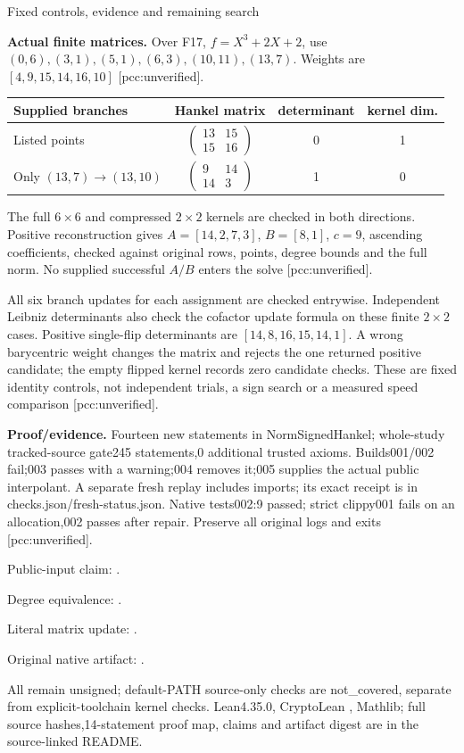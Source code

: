 \documentclass[11pt]{article}
\begin{document}
\newpage
{\Large Fixed controls, evidence and remaining search}\par
\textbf{Actual finite matrices.} Over F17, $f=X^3+2X+2$, use
$(0,6),(3,1),(5,1),(6,3),(10,11),(13,7)$. Weights are
$[4,9,15,14,16,10]$ [pcc:unverified].
\begin{center}
\begin{tabular}{lccc}
Supplied branches & Hankel matrix & determinant & kernel dim.\\\hline
Listed points & $\begin{pmatrix}13&15\\15&16\end{pmatrix}$ &0&1\\[6pt]
Only $(13,7)\to(13,10)$ & $\begin{pmatrix}9&14\\14&3\end{pmatrix}$ &1&0
\end{tabular}
\end{center}
The full $6\times6$ and compressed $2\times2$ kernels are checked in both
directions. Positive reconstruction gives $A=[14,2,7,3]$, $B=[8,1]$, $c=9$,
ascending coefficients, checked against original rows, points, degree bounds
and the full norm. No supplied successful $A/B$ enters the solve
[pcc:unverified].

All six branch updates for each assignment are checked entrywise. Independent
Leibniz determinants also check the cofactor update formula on these finite
$2\times2$ cases. Positive single-flip determinants are
$[14,8,16,15,14,1]$. A wrong barycentric weight changes the matrix and rejects
the one returned positive candidate; the empty flipped kernel records zero
candidate checks. These are fixed identity controls, not independent trials,
a sign search or a measured speed comparison [pcc:unverified].

\textbf{Proof/evidence.} Fourteen new statements in NormSignedHankel;
whole-study tracked-source gate245 statements,0 additional trusted axioms.
Builds001/002 fail;003 passes with a warning;004 removes it;005 supplies the
actual public interpolant. A separate fresh replay includes imports; its exact
receipt is in checks.json/fresh-status.json. Native tests002:9 passed;
strict clippy001 fails on an allocation,002 passes after repair. Preserve
all original logs and exits [pcc:unverified].

Public-input claim: .\par
Degree equivalence: .\par
Literal matrix update: .\par
Original native artifact: .\par
All remain unsigned; default-PATH source-only checks are not\_covered,
separate from explicit-toolchain kernel checks. Lean4.35.0, CryptoLean
, Mathlib; full source hashes,14-statement
proof map, claims and artifact digest are in the source-linked README.
\end{document}
